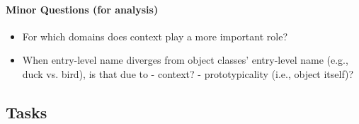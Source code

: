 \documentclass[11pt,a4paper]{article}
\begin{document}
\paragraph{Minor Questions (for analysis)}
\begin{itemize}
	\item For which domains does context play a more important role?
	\item When entry-level name diverges from object classes' entry-level name (e.g., duck vs. bird), is that due to
	- context?
	- prototypicality (i.e., object itself)?
\end{itemize}

\subsection{Tasks}
\label{ssec:exp_task}
\end{document}
